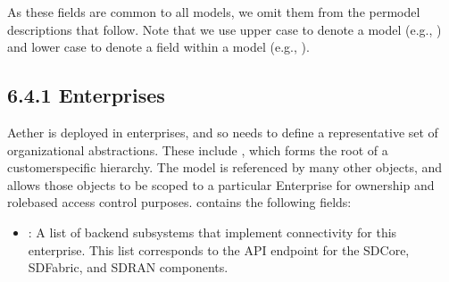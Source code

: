 \documentclass[a4paper,11pt,english]{sphinxmanual}
\begin{document}
\sphinxAtStartPar
As these fields are common to all models, we omit them from the
per\sphinxhyphen{}model descriptions that follow. Note that we use upper case to
denote a model (e.g., ) and lower case to denote a field
within a model (e.g., ).


\subsection{6.4.1 Enterprises}
\label{\detokenize{cloud:enterprises}}
\sphinxAtStartPar
Aether is deployed in enterprises, and so needs to define a
representative set of organizational abstractions. These include
, which forms the root of a customer\sphinxhyphen{}specific
hierarchy. The  model is referenced by many other objects,
and allows those objects to be scoped to a particular Enterprise for
ownership and role\sphinxhyphen{}based access control purposes. 
contains the following fields:
\begin{itemize}
\item {} 
\sphinxAtStartPar
{}: A list of backend subsystems that implement
connectivity for this enterprise. This list corresponds to the API
endpoint for the SD\sphinxhyphen{}Core, SD\sphinxhyphen{}Fabric, and SD\sphinxhyphen{}RAN components.

\end{itemize}
\end{document}
